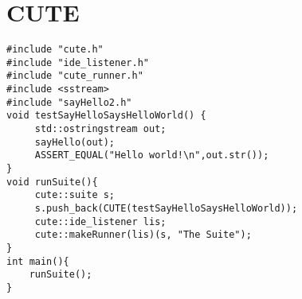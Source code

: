 \section{CUTE}
\begin{lstlisting}
#include "cute.h"
#include "ide_listener.h"
#include "cute_runner.h"
#include <sstream>
#include "sayHello2.h"
void testSayHelloSaysHelloWorld() {
	 std::ostringstream out;
	 sayHello(out);
	 ASSERT_EQUAL("Hello world!\n",out.str());
}
void runSuite(){
	 cute::suite s;
	 s.push_back(CUTE(testSayHelloSaysHelloWorld));
	 cute::ide_listener lis;
	 cute::makeRunner(lis)(s, "The Suite");
}
int main(){
	runSuite();
}
\end{lstlisting}
